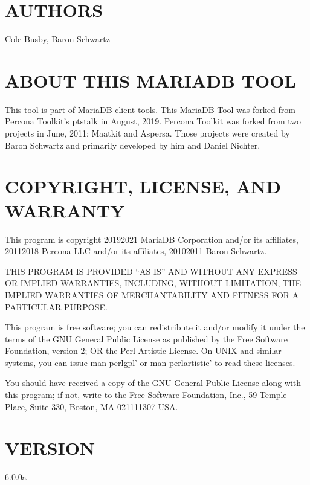 \documentclass[letterpaper,10pt,english]{sphinxmanual}
\begin{document}
\section{AUTHORS}
\label{\detokenize{mariadb-stat-browser:authors}}
Cole Busby, Baron Schwartz


\section{ABOUT THIS MARIADB TOOL}
\label{\detokenize{mariadb-stat-browser:about-this-mariadb-tool}}
This tool is part of MariaDB client tools. This MariaDB Tool was forked from
Percona Toolkit’s pt\sphinxhyphen{}stalk in August, 2019. Percona Toolkit was forked from two
projects in June, 2011: Maatkit and Aspersa.  Those projects were created by
Baron Schwartz and primarily developed by him and Daniel Nichter.


\section{COPYRIGHT, LICENSE, AND WARRANTY}
\label{\detokenize{mariadb-stat-browser:copyright-license-and-warranty}}
This program is copyright 2019\sphinxhyphen{}2021 MariaDB Corporation and/or its affiliates,
2011\sphinxhyphen{}2018 Percona LLC and/or its affiliates, 2010\sphinxhyphen{}2011 Baron Schwartz.

THIS PROGRAM IS PROVIDED “AS IS” AND WITHOUT ANY EXPRESS OR IMPLIED
WARRANTIES, INCLUDING, WITHOUT LIMITATION, THE IMPLIED WARRANTIES OF
MERCHANTABILITY AND FITNESS FOR A PARTICULAR PURPOSE.

This program is free software; you can redistribute it and/or modify it under
the terms of the GNU General Public License as published by the Free Software
Foundation, version 2; OR the Perl Artistic License.  On UNIX and similar
systems, you can issue \textasciigrave{}man perlgpl’ or \textasciigrave{}man perlartistic’ to read these
licenses.

You should have received a copy of the GNU General Public License along with
this program; if not, write to the Free Software Foundation, Inc., 59 Temple
Place, Suite 330, Boston, MA  02111\sphinxhyphen{}1307  USA.


\section{VERSION}
\label{\detokenize{mariadb-stat-browser:version}}
 6.0.0a
\end{document}
